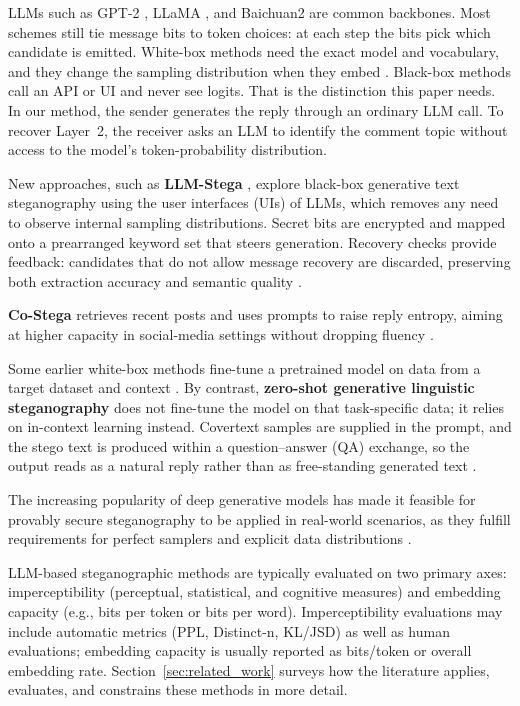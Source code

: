 LLMs such as GPT-2 \cite{radford2019language}, LLaMA \cite{touvron2023llama2}, and Baichuan2 \cite{yang2023baichuan2} are common backbones.
Most schemes still tie message bits to token choices: at each step the bits pick which candidate is emitted.
White-box methods need the exact model and vocabulary, and they change the sampling distribution when they embed \cite{wu2024generative}.
Black-box methods call an API or UI and never see logits.
That is the distinction this paper needs.
In our method, the sender generates the reply through an ordinary LLM call. To recover Layer~2, the receiver asks an LLM to identify the comment topic without access to the model's token-probability distribution.

New approaches, such as \textbf{LLM-Stega} \cite{wu2024generative}, explore black-box generative text steganography using the user interfaces (UIs) of LLMs, which removes any need to observe internal sampling distributions. Secret bits are encrypted and mapped onto a prearranged keyword set that steers generation. Recovery checks provide feedback: candidates that do not allow message recovery are discarded, preserving both extraction accuracy and semantic quality \cite{wu2024generative}.

\textbf{Co-Stega} retrieves recent posts and uses prompts to raise reply entropy, aiming at higher capacity in social-media settings without dropping fluency \cite{liao2024co}.

Some earlier white-box methods fine-tune a pretrained model on data from a target dataset and context \cite{yang2020vae,kaptchuk2021meteor,wang2023hi,pang2024fremax}. By contrast, \textbf{zero-shot generative linguistic steganography} does not fine-tune the model on that task-specific data; it relies on in-context learning instead. Covertext samples are supplied in the prompt, and the stego text is produced within a question--answer (QA) exchange, so the output reads as a natural reply rather than as free-standing generated text \cite{lin2024zero}.

The increasing popularity of deep generative models has made it feasible for provably secure steganography to be applied in real-world scenarios, as they fulfill requirements for perfect samplers and explicit data distributions \cite{ding2023discop, kaptchuk2021meteor, qi2024provably}.

LLM-based steganographic methods are typically evaluated on two primary axes: imperceptibility (perceptual, statistical, and cognitive measures) and embedding capacity (e.g., bits per token or bits per word). Imperceptibility evaluations may include automatic metrics (PPL, Distinct-n, KL/JSD) as well as human evaluations; embedding capacity is usually reported as bits/token or overall embedding rate. Section~\ref{sec:related_work} surveys how the literature applies, evaluates, and constrains these methods in more detail.
